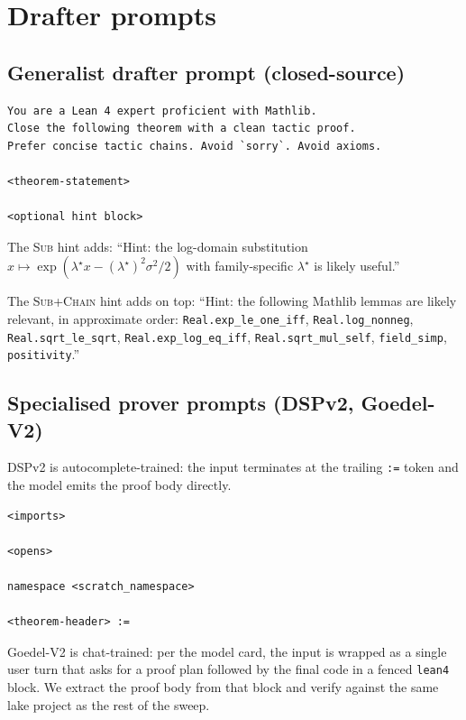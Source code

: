 \section{Drafter prompts}
\label{app:prompts}

\subsection{Generalist drafter prompt (closed-source)}

\begin{lstlisting}[basicstyle=\ttfamily\small,breaklines=true,breakautoindent=false,columns=flexible]
You are a Lean 4 expert proficient with Mathlib.
Close the following theorem with a clean tactic proof.
Prefer concise tactic chains. Avoid `sorry`. Avoid axioms.

<theorem-statement>

<optional hint block>
\end{lstlisting}

The \textsc{Sub} hint adds: ``Hint: the log-domain substitution
$x \mapsto \exp(\lambda^\star x - (\lambda^\star)^2 \sigma^2 / 2)$ with
family-specific $\lambda^\star$ is likely useful.''

The \textsc{Sub+Chain} hint adds on top: ``Hint: the following Mathlib lemmas
are likely relevant, in approximate order: \texttt{Real.exp\_le\_one\_iff},
\texttt{Real.log\_nonneg}, \texttt{Real.sqrt\_le\_sqrt},
\texttt{Real.exp\_log\_eq\_iff}, \texttt{Real.sqrt\_mul\_self},
\texttt{field\_simp}, \texttt{positivity}.''

\subsection{Specialised prover prompts (DSPv2, Goedel-V2)}

DSPv2 is autocomplete-trained: the input terminates at the trailing
\texttt{:=} token and the model emits the proof body directly.

\begin{lstlisting}[basicstyle=\ttfamily\small,breaklines=true,breakautoindent=false,columns=flexible]
<imports>

<opens>

namespace <scratch_namespace>

<theorem-header> :=
\end{lstlisting}

Goedel-V2 is chat-trained: per the model card, the input is wrapped
as a single user turn that asks for a proof plan followed by the
final code in a fenced \texttt{lean4} block. We extract the proof
body from that block and verify against the same lake project as
the rest of the sweep.

